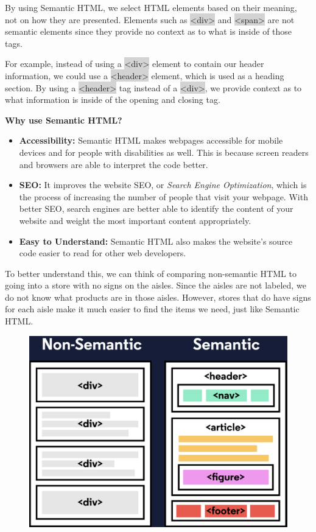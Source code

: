 \documentclass[11pt]{article}
\begin{document}
By using Semantic HTML, we select HTML elements based on their meaning, not on how they are presented. Elements such as \colorbox{lightgray}{<div>} and \colorbox{lightgray}{<span>} are not semantic elements since they provide no context as to what is inside of those tags.

For example, instead of using a \colorbox{lightgray}{<div>} element to contain our header information, we could use a \colorbox{lightgray}{<header>} element, which is used as a heading section. By using a \colorbox{lightgray}{<header>} tag instead of a \colorbox{lightgray}{<div>}, we provide context as to what information is inside of the opening and closing tag.

\textbf{Why use Semantic HTML?}
\begin{itemize}[leftmargin = *]
\item \textbf{Accessibility:} Semantic HTML makes webpages accessible for mobile devices and for people with disabilities as well. This is because screen readers and browsers are able to interpret the code better.

\item \textbf{SEO:} It improves the website SEO, or \textit{Search Engine Optimization}, which is the process of increasing the number of people that visit your webpage. With better SEO, search engines are better able to identify the content of your website and weight the most important content appropriately.

\item \textbf{Easy to Understand:} Semantic HTML also makes the website’s source code easier to read for other web developers.
\end{itemize}
To better understand this, we can think of comparing non-semantic HTML to going into a store with no signs on the aisles. Since the aisles are not labeled, we do not know what products are in those aisles. However, stores that do have signs for each aisle make it much easier to find the items we need, just like Semantic HTML.
\begin{figure}[H]
\includegraphics[scale = 0.2]{5_5}
\centering
\end{figure}
\vspace{-4mm}
\end{document}
